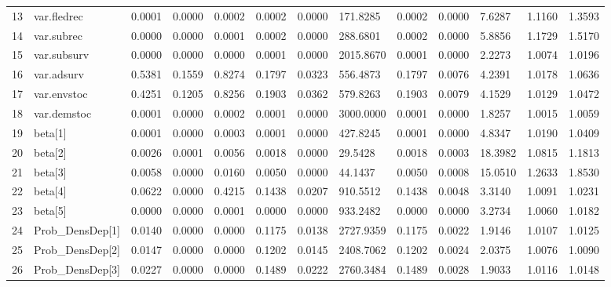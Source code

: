 \begin{table}[ht]
\begin{tabular}{rllllllllllll}
  13 & var.fledrec &    0.0001 &    0.0000 &    0.0002 &    0.0002 &       0.0000 &  171.8285 &    0.0002 &  0.0000 &  7.6287 & 1.1160 & 1.3593 \\ 
  14 & var.subrec &    0.0000 &    0.0000 &    0.0001 &    0.0002 &       0.0000 &  288.6801 &    0.0002 &  0.0000 &  5.8856 & 1.1729 & 1.5170 \\ 
  15 & var.subsurv &    0.0000 &    0.0000 &    0.0000 &    0.0001 &       0.0000 & 2015.8670 &    0.0001 &  0.0000 &  2.2273 & 1.0074 & 1.0196 \\ 
  16 & var.adsurv &    0.5381 &    0.1559 &    0.8274 &    0.1797 &       0.0323 &  556.4873 &    0.1797 &  0.0076 &  4.2391 & 1.0178 & 1.0636 \\ 
  17 & var.envstoc &    0.4251 &    0.1205 &    0.8256 &    0.1903 &       0.0362 &  579.8263 &    0.1903 &  0.0079 &  4.1529 & 1.0129 & 1.0472 \\ 
  18 & var.demstoc &    0.0001 &    0.0000 &    0.0002 &    0.0001 &       0.0000 & 3000.0000 &    0.0001 &  0.0000 &  1.8257 & 1.0015 & 1.0059 \\ 
  19 & beta[1] &    0.0001 &    0.0000 &    0.0003 &    0.0001 &       0.0000 &  427.8245 &    0.0001 &  0.0000 &  4.8347 & 1.0190 & 1.0409 \\ 
  20 & beta[2] &    0.0026 &    0.0001 &    0.0056 &    0.0018 &       0.0000 &   29.5428 &    0.0018 &  0.0003 & 18.3982 & 1.0815 & 1.1813 \\ 
  21 & beta[3] &    0.0058 &    0.0000 &    0.0160 &    0.0050 &       0.0000 &   44.1437 &    0.0050 &  0.0008 & 15.0510 & 1.2633 & 1.8530 \\ 
  22 & beta[4] &    0.0622 &    0.0000 &    0.4215 &    0.1438 &       0.0207 &  910.5512 &    0.1438 &  0.0048 &  3.3140 & 1.0091 & 1.0231 \\ 
  23 & beta[5] &    0.0000 &    0.0000 &    0.0001 &    0.0000 &       0.0000 &  933.2482 &    0.0000 &  0.0000 &  3.2734 & 1.0060 & 1.0182 \\ 
  24 & Prob\_DensDep[1] &    0.0140 &    0.0000 &    0.0000 &    0.1175 &       0.0138 & 2727.9359 &    0.1175 &  0.0022 &  1.9146 & 1.0107 & 1.0125 \\ 
  25 & Prob\_DensDep[2] &    0.0147 &    0.0000 &    0.0000 &    0.1202 &       0.0145 & 2408.7062 &    0.1202 &  0.0024 &  2.0375 & 1.0076 & 1.0090 \\ 
  26 & Prob\_DensDep[3] &    0.0227 &    0.0000 &    0.0000 &    0.1489 &       0.0222 & 2760.3484 &    0.1489 &  0.0028 &  1.9033 & 1.0116 & 1.0148 \\ 

\end{tabular}
\end{table}
